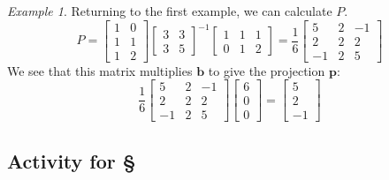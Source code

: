 \documentclass[11pt,oneside]{amsbook}
\theoremstyle{definition}
\theoremstyle{plain}
\theoremstyle{definition}
\theoremstyle{remark}
\newtheorem{example}[theorem]{Example}
\numberwithin{equation}{section}
\numberwithin{figure}{section}
\begin{document}
\begin{example}
  Returning to the first example, we can calculate $P$.
  \[P=\begin{bmatrix}1&0\\1&1\\1&2\end{bmatrix}
  \begin{bmatrix}3&3\\3&5\end{bmatrix}^{-1}
  \begin{bmatrix}1&1&1\\0&1&2\end{bmatrix}
  =\frac16\begin{bmatrix}5&2&-1\\2&2&2\\-1&2&5\end{bmatrix}
  \]
  We see that this matrix multiplies $\bm{b}$ to give the projection $\bm{p}$:
  \[\frac16\begin{bmatrix}5&2&-1\\2&2&2\\-1&2&5\end{bmatrix}
  \begin{bmatrix}6\\0\\0\end{bmatrix}
  =\begin{bmatrix}5\\2\\-1\end{bmatrix}
  \]
\end{example}

\newpage
\subsection*{Activity for \S \thesection}
\end{document}
